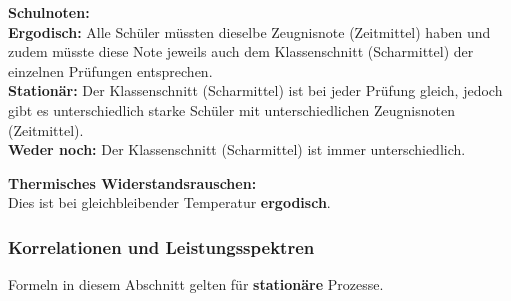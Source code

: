 \textbf{Schulnoten:}\\
\textbf{Ergodisch:} Alle Schüler müssten dieselbe Zeugnisnote (Zeitmittel) haben und zudem müsste
diese Note jeweils auch dem Klassenschnitt (Scharmittel) der einzelnen Prüfungen entsprechen. \\
\textbf{Stationär:} Der Klassenschnitt (Scharmittel) ist bei jeder Prüfung gleich, jedoch gibt es
unterschiedlich starke Schüler mit unterschiedlichen Zeugnisnoten (Zeitmittel). \\
\textbf{Weder noch:} Der Klassenschnitt (Scharmittel) ist immer unterschiedlich.

\textbf{Thermisches Widerstandsrauschen:} \\
Dies ist bei gleichbleibender Temperatur \textbf{ergodisch}.

\clearpage
\subsubsection{Korrelationen und Leistungsspektren}
Formeln in diesem Abschnitt gelten für \textbf{stationäre} Prozesse. \\

